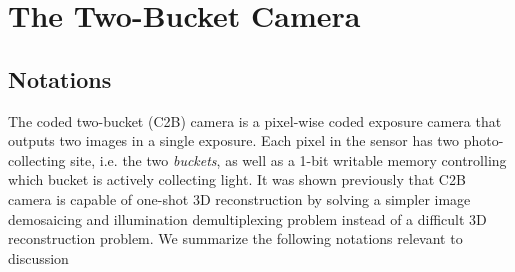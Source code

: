 \documentclass[../writeup.tex]{subfiles}
\begin{document}
  



\section{The Two-Bucket Camera}

\subsection{Notations}

The coded two-bucket (C2B) camera is a pixel-wise coded exposure camera that outputs two images in a single exposure.\cite{weiCodedTwoBucketCameras2018} Each pixel in the sensor has two photo-collecting site, i.e. the two \textit{buckets}, as well as a 1-bit writable memory controlling which bucket is actively collecting light. It was shown previously that C2B camera is capable of one-shot 3D reconstruction by solving a simpler image demosaicing and illumination demultiplexing problem instead of a difficult 3D reconstruction problem. We summarize the following notations relevant to discussion
\end{document}
